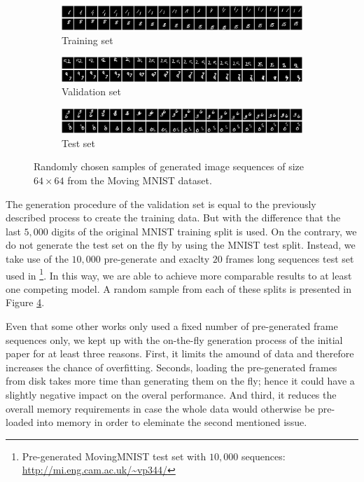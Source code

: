 \begin{figure}[htpb]
\centering
\begin{subfigure}{1.0\textwidth}
  \centering
  \includegraphics[width=1.0\linewidth]{figures/ds/mm_train.png}
  \caption{Training set}
  \label{fig:mm_train}
  \vspace{.1cm}
\end{subfigure}
\begin{subfigure}{1.0\textwidth}
  \centering
  \includegraphics[width=1.0\linewidth]{figures/ds/mm_valid.png}
  \caption{Validation set}
  \label{fig:mm_valid}
  \vspace{.1cm}
\end{subfigure}
\begin{subfigure}{1.0\textwidth}
  \centering
  \includegraphics[width=1.0\linewidth]{figures/ds/mm_test.png}
  \caption{Test set}
  \label{fig:mm_test}
\end{subfigure}
\caption[MovingMNIST Image Sequence Samples]{Randomly chosen samples of generated image sequences of size $64 \times 64$ from the Moving MNIST dataset.}
\label{fig:moving_mnist}
\end{figure}

The generation procedure of the validation set is equal to the previously described process to create the training data. But with the difference that the last $5,000$ digits of the original MNIST training split is used. On the contrary, we do not generate the test set on the fly by using the MNIST test split. Instead, we take use of the $10,000$ pre-generate and exaclty $20$ frames long sequences test set used in \parencite{spat_temp_video_autoenc}\footnote{Pre-generated MovingMNIST test set with $10,000$ sequences: \url{http://mi.eng.cam.ac.uk/~vp344/}}. In this way, we are able to achieve more comparable results to at least one competing model. A random sample from each of these splits is presented in Figure \ref{fig:moving_mnist}.

Even that some other works only used a fixed number of pre-generated frame sequences only, we kept up with the on-the-fly generation process of the initial paper for at least three reasons. First, it limits the amound of data and therefore increases the chance of overfitting. Seconds, loading the pre-generated frames from disk takes more time than generating them on the fly; hence it could have a slightly negative impact on the overal performance. And third, it reduces the overall memory requirements in case the whole data would otherwise be pre-loaded into memory in order to eleminate the second mentioned issue.


